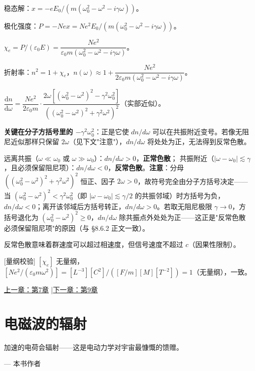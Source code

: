 \documentclass[11pt,a4paper,openany,oneside]{book}
\newcommand{\diff}{\mathrm{d}}
\newcommand{\eps}{\varepsilon}
\begin{document}
稳态解：$x = -eE_0/(m(\omega_0^2 - \omega^2 - i\gamma\omega))$。

极化强度：$P = -Nex = Ne^2E_0/(m(\omega_0^2 - \omega^2 - i\gamma\omega))$。

$\chi_e = P/(\eps_0 E) = \dfrac{Ne^2}{\eps_0 m(\omega_0^2 - \omega^2 - i\gamma\omega)}$。

折射率：$n^2 = 1 + \chi_e$，$n(\omega) \approx 1 + \dfrac{Ne^2}{2\eps_0 m(\omega_0^2 - \omega^2 - i\gamma\omega)}$。

$\dfrac{\diff n}{\diff\omega} = \dfrac{Ne^2}{2\eps_0 m}\cdot\dfrac{2\omega\left[(\omega_0^2 - \omega^2)^2 - \gamma^2\omega_0^2\right]}{\left((\omega_0^2 - \omega^2)^2 + \gamma^2\omega^2\right)^2}$（实部近似）。

\textbf{关键在分子方括号里的 $-\gamma^2\omega_0^2$}：正是它使 $dn/d\omega$ 可以在共振附近变号。若像无阻尼近似那样只保留 $2\omega$（见下文"注意"），$dn/d\omega$ 将处处为正，无法得到反常色散。

远离共振（$\omega\ll\omega_0$ 或 $\omega\gg\omega_0$）：$dn/d\omega > 0$，\textbf{正常色散}；
共振附近（$|\omega-\omega_0|\lesssim\gamma$，且必须保留阻尼项）：$dn/d\omega < 0$，\textbf{反常色散}。\textbf{注意}：分母 $((\omega_0^2-\omega^2)^2+\gamma^2\omega^2)^2$ 恒正、因子 $2\omega>0$，故符号完全由分子方括号决定——当 $(\omega_0^2-\omega^2)^2 < \gamma^2\omega_0^2$（即 $|\omega-\omega_0| \lesssim \gamma/2$ 的共振邻域）时方括号为负，$dn/d\omega<0$；离开该邻域后方括号转正，$dn/d\omega>0$。若取无阻尼极限 $\gamma\to0$，方括号退化为 $(\omega_0^2-\omega^2)^2\geq0$，$dn/d\omega$ 除共振点外处处为正——这正是"反常色散必须保留阻尼项"的原因（与 §8.6.2 正文一致）。

反常色散意味着群速度可以超过相速度，但信号速度不超过 $c$（因果性限制）。\qedsymbol

[量纲校验] $[\chi_e]$ 无量纲，$[Ne^2/(\eps_0 m\omega^2)] = [L^{-3}][C^2]/([F/m][M][T^{-2}]) = 1$（无量纲），一致。\qedsymbol





\begin{center}\small \hyperlink{ch7-goal}{上一章：第7章} \quad|\quad \hyperlink{ch9-goal}{下一章：第9章}\end{center}

\chapter{电磁波的辐射}
\epigraph{加速的电荷会辐射——这是电动力学对宇宙最慷慨的馈赠。}{--- 本书作者}
\end{document}
